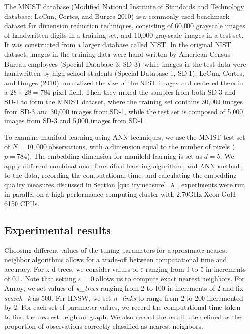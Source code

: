 \documentclass[12pt]{article}
\begin{document}
The MNIST database (Modified National Institute of Standards and Technology database; LeCun, Cortes, and Burges 2010) is a commonly used benchmark dataset for dimension reduction techniques, consisting of 60,000 grayscale images of handwritten digits in a training set, and 10,000 grayscale images in a test set. It was constructed from a larger database called NIST. In the original NIST dataset, images in the training data were hand-written by American Census Bureau employees (Special Database 3, SD-3), while images in the test data were handwritten by high school students (Special Database 1, SD-1). LeCun, Cortes, and Burges (2010) normalized the size of the NIST images and centered them in a \(28\times 28=784\) pixel field. Then they mixed the samples from both SD-3 and SD-1 to form the MNIST dataset, where the training set contains 30,000 images from SD-3 and 30,000 images from SD-1, while the test set is composed of 5,000 images from SD-3 and 5,000 images from SD-1.

To examine manifold learning using ANN techniques, we use the MNIST test set of \(N=10,000\) observations, with a dimension equal to the number of pixels (\(p=784\)). The embedding dimension for manifold learning is set as \(d=5\). We apply different combinations of manifold learning algorithms and ANN methods to the data, recording the computational time, and calculating the embedding quality measures discussed in Section \ref{qualitymeasure}. All experiments were run in parallel on a high performance computing cluster with 2.70GHz Xeon-Gold-6150 CPUs.

\hypertarget{mnistresults}{%
\subsection{Experimental results}\label{mnistresults}}

Choosing different values of the tuning parameters for approximate nearest neighbor algorithms allows for a trade-off between computational time and accuracy. For k-d trees, we consider values of \(\varepsilon\) ranging from 0 to 5 in increments of 0.1. Note that setting \(\varepsilon=0\) allows us to compute exact nearest neighbors. For Annoy, we set values of \textit{n\_trees} ranging from 2 to 100 in increments of 2 and fix \textit{search\_k} as 500. For HNSW, we set \textit{n\_links} to range from 2 to 200 incremented by 2. For each set of parameter values, we record the computational time taken to find the nearest neighbor graph. We also record the recall rate defined as the proportion of observations correctly classified as nearest neighbors.
\end{document}
